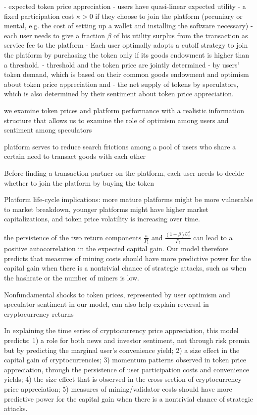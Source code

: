     - expected token price appreciation
  - users have quasi-linear expected utility 
  - a fixed participation cost $\kappa > 0$ if they choose to join the platform (pecuniary or mental, e.g. the cost of setting up a wallet and installing the software necessary)
  - each user needs to give a fraction $\beta$ of his utility surplus from the transaction as service fee to the platform
  - Each user optimally adopts a cutoff strategy to join the platform by purchasing the token only if its goods endowment is higher than a threshold.
  - threshold and the token price are jointly determined
    - by users' token demand, which is based on their common goods endowment and optimism about token price appreciation and 
    - the net supply of tokens by speculators, which is also determined by their sentiment about token price appreciation.

we examine token prices and platform performance with a realistic information structure that allows us to examine the role of optimism among users and sentiment among speculators

platform serves to reduce search frictions among a pool of users who share a certain need to transact goods with each other

Before finding a transaction partner on the platform, each user needs to decide whether to join
the platform by buying the token

Platform life-cycle implications: more mature platforms might be more vulnerable to market
breakdown, younger platforms might have higher market capitalizations, and token price volatility
is increasing over time.

the persistence of the two return components $\frac{\kappa}{P_{t}}$ and $\frac{\left(1-\beta\right)U_{t}^{*}}{P_{t}}$ can lead to a positive autocorrelation in the expected capital gain. Our model therefore predicts that measures of mining
costs should have more predictive power for the capital gain when there is a nontrivial chance of
strategic attacks, such as when the hashrate or the number of miners is low.

Nonfundamental shocks to token prices, represented by user optimism and speculator sentiment in our model, can also help explain reversal in cryptocurrency returns

In explaining the time series of cryptocurrency price appreciation, this model predicts: 1) a role for both news and investor sentiment, not through risk premia but by predicting the marginal user's convenience yield; 2) a size effect in the capital gain of cryptocurrencies; 3) momentum patterns observed in token price appreciation, through the persistence of user participation costs and convenience yields; 4) the size effect that is observed in the cross-section of cryptocurrency price appreciation; 5) measures of mining/validator costs should have more predictive power for the capital gain when there is a nontrivial chance of strategic attacks. 

